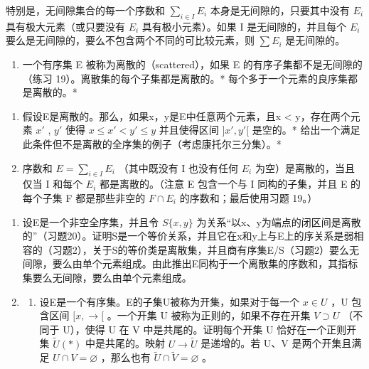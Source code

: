 特别是，无间隙集合的每一个序数和 \(\sum_{i\in I}E_i\) 本身是无间隙的，只要其中没有 \(E_i\) 具有极大元素（或只要没有 \(E_i\) 具有极小元素）。如果 I 是无间隙的，并且每个 \(E_i\) 要么是无间隙的，要么不包含两个不同的可比较元素，则 \(\sum E_i\) 是无间隙的。

\begin{enumerate}
\def\labelenumi{\arabic{enumi}.}
\setcounter{enumi}{19}
\tightlist
\item
  一个有序集 E 被称为离散的（scattered），如果 E 的有序子集都不是无间隙的（练习 19）。离散集的每个子集都是离散的。* 每个多于一个元素的良序集都是离散的。*
\end{enumerate}

\begin{enumerate}
\def\labelenumi{(\alph{enumi})}
\item
  假设E是离散的。那么，如果x，y是E中任意两个元素，且x \textless{} y，存在两个元素 \(x'\) , \(y'\) 使得 \(x \leqslant x' < y' \leqslant y\) 并且使得区间 \(]x', y'[\) 是空的。* 给出一个满足此条件但不是离散的全序集的例子（考虑康托尔三分集）。*
\item
  序数和 \(E = \sum_{i \in I} E_i\) （其中既没有 I 也没有任何 \(E_i\) 为空）是离散的，当且仅当 I 和每个 \(E_i\) 都是离散的。（注意 E 包含一个与 I 同构的子集，并且 E 的每个子集 F 都是那些非空的 \(F \cap E_i\) 的序数和；最后使用习题 19。）
\end{enumerate}

\begin{enumerate}
\def\labelenumi{\arabic{enumi}.}
\setcounter{enumi}{20}
\item
  设E是一个非空全序集，并且令 \(S\{x,y\}\) 为关系“以x、y为端点的闭区间是离散的”（习题20）。证明S是一个等价关系，并且它在x和y上与E上的序关系是弱相容的（习题2），关于S的等价类是离散集，并且商有序集E/S（习题2）要么无间隙，要么由单个元素组成。由此推出E同构于一个离散集的序数和，其指标集要么无间隙，要么由单个元素组成。
\item
  \begin{enumerate}
  \def\labelenumii{(\alph{enumii})}
  \tightlist
  \item
    设E是一个有序集。E的子集U被称为开集，如果对于每一个 \(x \in U\) ，U 包含区间 \([x, \rightarrow[\) 。一个开集 U 被称为正则的，如果不存在开集 \(V \supset U\) （不同于 U），使得 U 在 V 中是共尾的。证明每个开集 U 恰好在一个正则开集 \(\tilde{U} (*)\) 中是共尾的。映射 \(U \to \tilde{U}\) 是递增的。若 U、V 是两个开集且满足 \(U \cap V = \varnothing\) ，那么也有 \(\tilde{U} \cap \tilde{V} = \varnothing\) 。
  \end{enumerate}
\end{enumerate}


